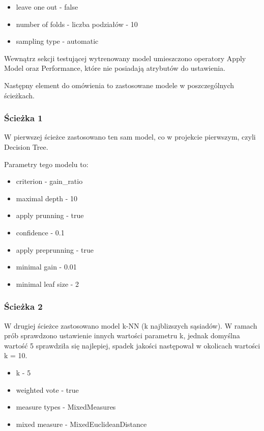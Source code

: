 \documentclass[12pt,oneside,a4paper]{book} %
\theoremstyle{break}
\begin{document}
\begin{itemize}
  \item leave one out - false
  \item number of folds - liczba podziałów - 10
  \item sampling type - automatic
\end{itemize}

Wewnątrz sekcji testującej wytrenowany model umieszczono operatory Apply Model oraz Performance, które nie posiadają atrybutów do ustawienia.

Następny element do omówienia to zastosowane modele w poszczególnych ścieżkach.

\subsubsection*{Ścieżka 1}

W pierwszej ścieżce zastosowano ten sam model, co w projekcie pierwszym, czyli Decision Tree.

Parametry tego modelu to:
\begin{itemize}
  \item criterion - gain\_ratio
  \item maximal depth - 10
  \item apply prunning - true
  \item confidence - 0.1
  \item apply preprunning - true
  \item minimal gain - 0.01
  \item minimal leaf size - 2
\end{itemize}

\subsubsection*{Ścieżka 2}

W drugiej ścieżce zastosowano model k-NN (k najblizszych sąsiadów). W ramach prób sprawdzono ustawienie innych wartości parametru k, jednak domyślna wartość 5 sprawdziła się najlepiej, spadek jakości następował w okolicach wartości k = 10.

\begin{itemize}
  \item k - 5
  \item weighted vote - true
  \item measure types - MixedMeasures
  \item mixed measure - MixedEuclideanDistance
\end{itemize}
\end{document}
